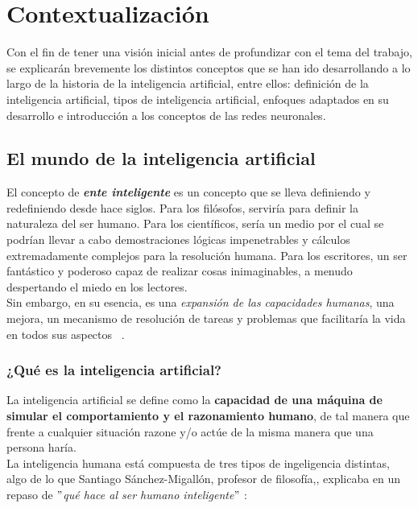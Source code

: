 
\chapter{Contextualización}\label{contextualizacion}

Con el fin de tener una visión inicial antes de profundizar con el tema del trabajo, se explicarán brevemente los distintos conceptos que se han ido desarrollando a lo largo de la historia de la inteligencia artificial, entre ellos: definición de la inteligencia artificial, tipos de inteligencia artificial, enfoques adaptados en su desarrollo e introducción a los conceptos de las redes neuronales.

\section{El mundo de la inteligencia artificial}

El concepto de \textbf{\textit{ente inteligente}} es un concepto que se lleva definiendo y redefiniendo desde hace siglos. Para los filósofos, serviría para definir la naturaleza del ser humano. Para los científicos, sería un medio por el cual se podrían llevar a cabo demostraciones lógicas impenetrables y cálculos extremadamente complejos para la resolución humana. Para los escritores, un ser fantástico y poderoso capaz de realizar cosas inimaginables, a menudo despertando el miedo en los lectores. \\

Sin embargo, en su esencia, es una \textit{expansión de las capacidades humanas}, una mejora, un mecanismo de resolución de tareas y problemas que facilitaría la vida en todos sus aspectos ~\cite{buchanan2005very}.

\subsection{¿Qué es la inteligencia artificial?}

La inteligencia artificial se define como la \textbf{capacidad de una máquina de simular el comportamiento y el razonamiento humano}, de tal manera que frente a cualquier situación razone y/o actúe de la misma manera que una persona haría. \\

La inteligencia humana está compuesta de tres tipos de ingeligencia distintas, algo de lo que Santiago Sánchez-Migallón, profesor de filosofía,, explicaba en un repaso de $"$\textit{qué hace al ser humano inteligente}$"$ \cite{pastor2008inteligencia}: 

